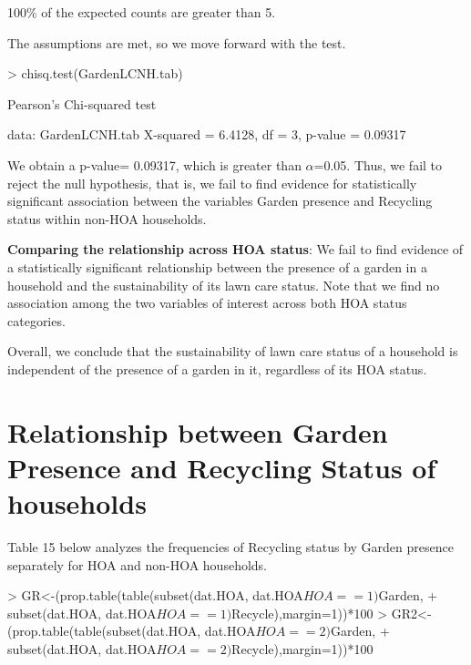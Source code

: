 \documentclass{article}
\begin{document}
100\% of the expected counts are greater than 5.

The assumptions are met, so we move forward with the test.

\begin{Schunk}
\begin{Sinput}
> chisq.test(GardenLCNH.tab)
\end{Sinput}
\begin{Soutput}
	Pearson's Chi-squared test

data:  GardenLCNH.tab
X-squared = 6.4128, df = 3, p-value = 0.09317
\end{Soutput}
\end{Schunk}

We obtain a p-value= 0.09317, which is greater than $\alpha$=0.05. Thus, we fail to reject the null hypothesis, that is, we fail to find evidence for statistically significant association between the variables Garden presence and Recycling status within non-HOA households.

\textbf{Comparing the relationship across HOA status}: We fail to find evidence of a statistically significant relationship between the presence of a garden in a household and the sustainability of its lawn care status. Note that we find no association among the two variables of interest across both HOA status categories.

Overall, we conclude that the sustainability of lawn care status of a household is independent of the presence of a garden in it, regardless of its HOA status.

\section*{Relationship between Garden Presence and Recycling Status of households}

Table 15 below analyzes the frequencies of Recycling status by Garden presence separately for HOA and non-HOA households. 

\begin{Schunk}
\begin{Sinput}
> GR<-(prop.table(table(subset(dat.HOA, dat.HOA$HOA==1)$Garden,
+                                        subset(dat.HOA, dat.HOA$HOA==1)$Recycle),margin=1))*100
> GR2<-(prop.table(table(subset(dat.HOA, dat.HOA$HOA==2)$Garden,
+                                        subset(dat.HOA, dat.HOA$HOA==2)$Recycle),margin=1))*100
\end{Sinput}
\end{Schunk}
\end{document}
